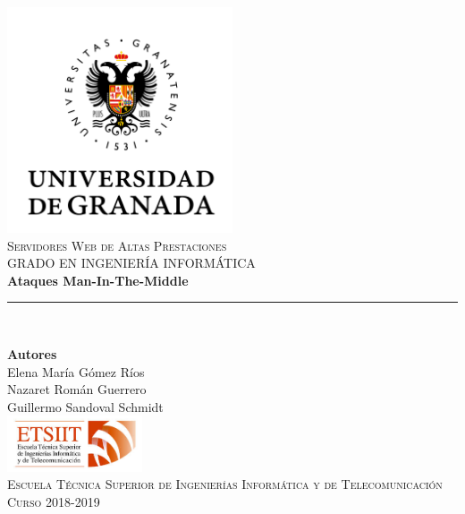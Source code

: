 \documentclass[11pt,a4paper]{article}
\begin{document}
\sloppy
\begin{titlepage}

\begin{minipage}{\textwidth}

\centering
\includegraphics[width=0.5\textwidth]{logo.png}\\

\textsc{\Large Servidores Web de Altas Prestaciones\\[0.2cm]}
\textsc{GRADO EN INGENIERÍA INFORMÁTICA}\\[1cm]

{\Huge\bfseries Ataques Man-In-The-Middle\\}
\noindent\rule[-1ex]{\textwidth}{3pt}\\[3.5ex]
{\large\bfseries}
\end{minipage}

\vspace{1.5cm}
\begin{minipage}{\textwidth}
\centering

\textbf{Autores}\\ {Elena María Gómez Ríos\\Nazaret Román Guerrero\\Guillermo Sandoval Schmidt}\\[2.5ex]
\includegraphics[width=0.3\textwidth]{etsiit.jpeg}\\[0.1cm]
\vspace{1cm}
\textsc{Escuela Técnica Superior de Ingenierías Informática y de Telecomunicación}\\
\vspace{1cm}
\textsc{Curso 2018-2019}
\end{minipage}
\end{titlepage}
\end{document}
